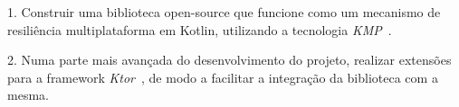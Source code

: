 1.
Construir uma biblioteca open-source que funcione como um mecanismo de resiliência multiplataforma em Kotlin, utilizando a tecnologia \textit{KMP}~\cite{kmp}.

2.
Numa parte mais avançada do desenvolvimento do projeto, realizar extensões para a framework \textit{Ktor}~\cite{ktor}, de modo a facilitar a integração da biblioteca com a mesma.